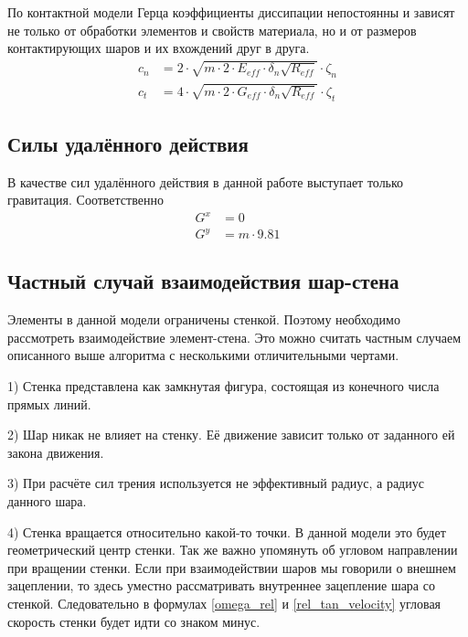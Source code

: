 \documentclass[a4paper]{article}
\begin{document}
По контактной модели Герца \cite{aglomerath} коэффициенты диссипации непостоянны и зависят не только от обработки элементов и свойств материала, но и от размеров контактирующих шаров и их вхождений друг в друга.
\begin{align}
\label{kef_dempf}
c_n &= 2 \cdot \sqrt{m \cdot 2 \cdot E_{eff} \cdot \delta_n \sqrt{R_{eff}}} \cdot \zeta_n \\
c_t &= 4 \cdot \sqrt{m \cdot 2 \cdot G_{eff} \cdot \delta_n \sqrt{R_{eff}}} \cdot \zeta_t
\end{align}


\subsection{Силы удалённого действия}
\label{gravitation_subsection}

В качестве сил удалённого действия в данной работе выступает только гравитация.
Соответственно
\begin{align}
G^x &= 0 \\
G^y &= m \cdot 9.81
\end{align}

\subsection{Частный случай взаимодействия шар-стена}
\label{wall_subsection}

Элементы в данной модели ограничены стенкой. 
Поэтому необходимо рассмотреть взаимодействие элемент-стена.
Это можно считать частным случаем описанного выше алгоритма с несколькими отличительными чертами.

1) Стенка представлена как замкнутая фигура, состоящая из конечного числа прямых линий.

2) Шар никак не влияет на стенку. 
Её движение зависит только от заданного ей закона движения.

3) При расчёте сил трения используется не эффективный радиус, а радиус данного шара.

4) Стенка вращается относительно какой-то точки.
В данной модели это будет геометрический центр стенки.
Так же важно упомянуть об угловом направлении при вращении стенки.
Если при взаимодействии шаров мы говорили о внешнем зацеплении, то здесь уместно рассматривать внутреннее зацепление шара со стенкой.
Следовательно в формулах \ref{omega_rel} и \ref{rel_tan_velocity} угловая скорость стенки будет идти со знаком минус.
\end{document}
